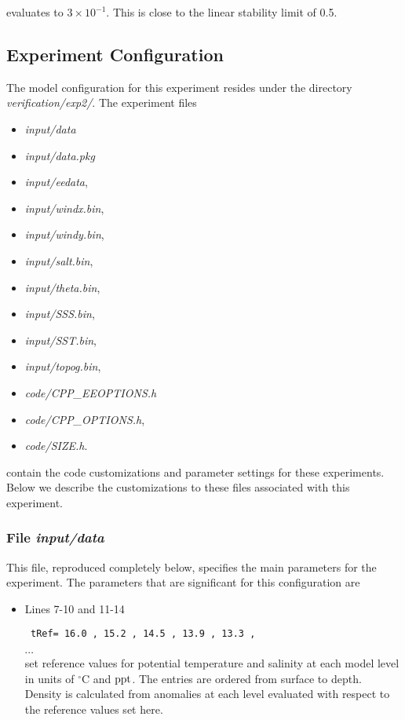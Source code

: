 {\noindent evaluates to $3 \times 10^{-1}$. This is close to the linear
stability limit of 0.5.
  
\subsection{Experiment Configuration}
\label{SEC:eg-hs_examp_exp_config}

The model configuration for this experiment resides under the 
directory {\it verification/exp2/}.  The experiment files 
\begin{itemize}
\item {\it input/data}
\item {\it input/data.pkg}
\item {\it input/eedata},
\item {\it input/windx.bin},
\item {\it input/windy.bin},
\item {\it input/salt.bin},
\item {\it input/theta.bin},
\item {\it input/SSS.bin},
\item {\it input/SST.bin},
\item {\it input/topog.bin},
\item {\it code/CPP\_EEOPTIONS.h}
\item {\it code/CPP\_OPTIONS.h},
\item {\it code/SIZE.h}. 
\end{itemize}
contain the code customizations and parameter settings for these
experiments. Below we describe the customizations
to these files associated with this experiment.

\subsubsection{File {\it input/data}}

This file, reproduced completely below, specifies the main parameters 
for the experiment. The parameters that are significant for this configuration
are

\begin{itemize}

\item Lines 7-10 and 11-14 
\begin{verbatim} tRef= 16.0 , 15.2 , 14.5 , 13.9 , 13.3 ,  \end{verbatim} 
$\cdots$ \\
set reference values for potential
temperature and salinity at each model level in units of $^{\circ}$C and
${\rm ppt}$. The entries are ordered from surface to depth.
Density is calculated from anomalies at each level evaluated
with respect to the reference values set here.\\



\end{itemize}}
